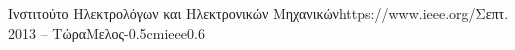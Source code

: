 \documentclass{mycv}
\begin{document}
	\vspace*{0.5cm}
	
	\begin{EntryDatedLogo}{Ινστιτούτο Ηλεκτρολόγων και Ηλεκτρονικών Μηχανικών}{https://www.ieee.org/}{Σεπτ. 2013 -- Τώρα}{Μελος}{-0.5cm}{ieee}{0.6}
	\end{EntryDatedLogo}
	
\end{document}
